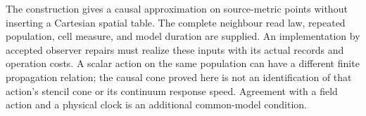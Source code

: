 The construction gives a causal approximation on source-metric points
without inserting a Cartesian spatial table. The complete neighbour read
law, repeated population, cell measure, and model duration are supplied.
An implementation by accepted observer repairs must realize these inputs
with its actual records and operation costs. A scalar action on the same
population can have a different finite propagation relation; the causal
cone proved here is not an identification of that action's stencil cone
or its continuum response speed. Agreement with a field action and a
physical clock is an additional common-model condition.
